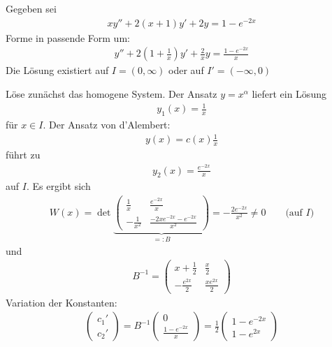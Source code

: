 \begin{example} \label{4.7}
	Gegeben sei
	\begin{align*}
		xy'' + 2(x+1)y' + 2y = 1 - e^{-2x}
	\end{align*}
	Forme in passende Form um:
	\begin{align*}
		y'' + 2(1+\tfrac 1x) y' + \frac 2x y = \frac {1-e^{-2x}}x
	\end{align*}
	Die Lösung existiert auf $I = (0,\infty)$ oder auf $I' = (-\infty,0)$
	\begin{enum-arab}
		\item
			Löse zunächst das homogene System.
			Der Ansatz $y = x^{\alpha}$ liefert ein Lösung
			\begin{align*}
				y_1(x) = \frac 1 x
			\end{align*}
			für $x \in I$.
			Der Ansatz von d'Alembert:
			\begin{align*}
				y(x) = c(x) \frac 1x
			\end{align*}
			führt zu
			\begin{align*}
				y_2(x) = \frac {e^{-2x}}x
			\end{align*}
			auf $I$.
			Es ergibt sich
			\begin{align*}
				W(x) = \det \underbrace{\begin{pmatrix}
					\frac 1x & \frac {e^{-2x}}{x} \\
					- \frac 1{x^2} & \frac {-2xe^{-2x}-e^{-2x}}{x^2}
				\end{pmatrix}}_{=:B} = - \frac {2e^{-2x}}{x^2} \neq 0 \qquad \text{(auf $I$)}
			\end{align*}
			und
			\begin{align*}
				B^{-1} = \begin{pmatrix}
					x+\frac 12 & \frac x2 \\
					-\frac {e^{2x}}{2} & \frac {xe^{2x}}2
				\end{pmatrix}
			\end{align*}
			Variation der Konstanten:
			\begin{align*}
				\begin{pmatrix}
					c_1' \\ c_2'
				\end{pmatrix} = B^{-1} \begin{pmatrix}
					0 \\ \frac {1-e^{-2x}}x
				\end{pmatrix} = \frac 12 \begin{pmatrix}
					1 - e^{-2x} \\ 1 - e^{2x}

\end{pmatrix}
\end{align*}
\end{enum-arab}
\end{example}
